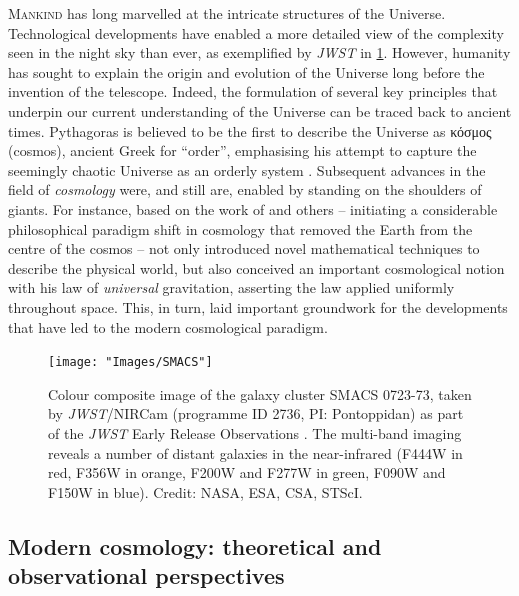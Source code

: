 \lettrine{M}{ankind} has long marvelled at the intricate structures of the Universe. Technological developments have enabled a more detailed view of the complexity seen in the night sky than ever, as exemplified by \textit{JWST} in \cref{chIfig:SMACS}. However, humanity has sought to explain the origin and evolution of the Universe long before the invention of the telescope. Indeed, the formulation of several key principles that underpin our current understanding of the Universe can be traced back to ancient times. Pythagoras is believed to be the first to describe the Universe as \textgreek{κόσμος} (cosmos), ancient Greek for ``order'', emphasising his attempt to capture the seemingly chaotic Universe as an orderly system \citep[e.g.][]{1860Humboldt}. Subsequent advances in the field of \textit{cosmology} were, and still are, enabled by standing on the shoulders of giants. For instance, based on the work of \citet{Copernicus1543} and others -- initiating a considerable philosophical paradigm shift in cosmology that removed the Earth from the centre of the cosmos -- \citet{Newton1687} not only introduced novel mathematical techniques to describe the physical world, but also conceived an important cosmological notion with his law of \textit{universal} gravitation, asserting the law applied uniformly throughout space. This, in turn, laid important groundwork for the developments that have led to the modern cosmological paradigm.
\begin{figure}
    \centering
    \texttt{[image: "Images/SMACS"]}
    \caption[Colour composite image of the galaxy cluster SMACS 0723-73]
    {Colour composite image of the galaxy cluster SMACS 0723-73, taken by \textit{JWST}/NIRCam (programme ID 2736, PI: Pontoppidan) as part of the \textit{JWST} Early Release Observations \citep[EROs;][]{2022ApJ...936L..14P}. The multi-band imaging reveals a number of distant galaxies in the near-infrared (F444W in red, F356W in orange, F200W and F277W in green, F090W and F150W in blue). Credit: NASA, ESA, CSA, STScI.}
    \label{chIfig:SMACS}
\end{figure}

\subsection{Modern cosmology: theoretical and observational perspectives}
\label{chIssec:Modern_cosmology}

